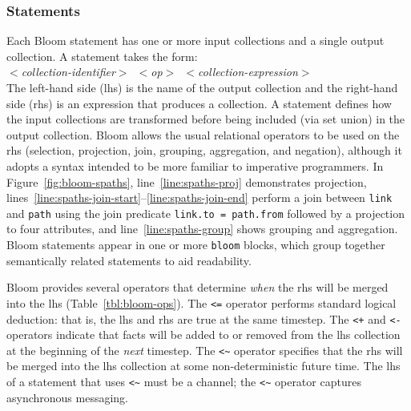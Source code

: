 \subsubsection{Statements}
Each Bloom statement has one or more input collections and a single output
collection.  A statement takes the form: \\ \noindent
\mbox{\hspace{0.25in}\emph{$<$collection-identifier$>$ $<$op$>$
    $<$collection-expression$>$}}\\ \noindent
The left-hand side (lhs) is the name of the output collection and the right-hand
side (rhs) is an expression that produces a collection.  A statement defines how
the input collections are transformed before being included (via set union) in
the output collection. Bloom allows the usual relational operators to be used on
the rhs (selection, projection, join, grouping, aggregation, and negation),
although it adopts a syntax intended to be more familiar to imperative
programmers. In Figure~\ref{fig:bloom-spaths}, line~\ref{line:spaths-proj}
demonstrates projection,
lines~\ref{line:spaths-join-start}--\ref{line:spaths-join-end} perform a join
between \texttt{link} and \texttt{path} using the join predicate
\verb+link.to = path.from+ followed by a projection to four attributes, and
line~\ref{line:spaths-group} shows grouping and aggregation. Bloom statements
appear in one or more \texttt{bloom} blocks, which group together semantically
related statements to aid readability.


Bloom provides several operators that determine \emph{when} the rhs will be
merged into the lhs (Table~\ref{tbl:bloom-ops}). The \verb|<=| operator performs
standard logical deduction: that is, the lhs and rhs are true at the same
timestep. The \verb|<+| and \verb|<-| operators indicate that facts will be
added to or removed from the lhs collection at the beginning of the \emph{next}
timestep. The \verb+<~+ operator specifies that the rhs will be merged into the
lhs collection at some non-deterministic future time. The lhs of a statement
that uses \verb+<~+ must be a channel; the \verb+<~+ operator captures
asynchronous messaging.

